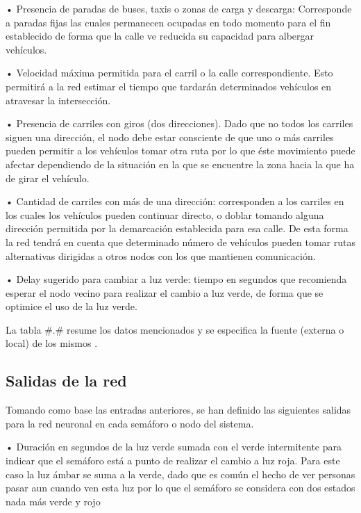 •	Presencia de paradas de buses, taxis o zonas de carga y descarga: Corresponde a paradas fijas las cuales permanecen ocupadas en todo momento para el fin establecido de forma que la calle ve reducida su capacidad para albergar veh\'{i}culos.

•	Velocidad m\'{a}xima permitida para el carril o la calle correspondiente. Esto permitir\'{a} a la red estimar el tiempo que tardar\'{a}n determinados veh\'{i}culos en atravesar la intersecci\'{o}n.

•	Presencia de carriles con giros (dos direcciones). Dado que no todos los carriles siguen una direcci\'{o}n, el nodo debe estar consciente de que uno o m\'{a}s carriles pueden permitir a los veh\'{i}culos tomar otra ruta por lo que \'{e}ste movimiento puede afectar dependiendo de la situaci\'{o}n en la que se encuentre la zona hacia la que ha de girar el veh\'{i}culo.

•	Cantidad de carriles con m\'{a}s de una direcci\'{o}n: corresponden a los carriles en los cuales los veh\'{i}culos pueden continuar directo, o doblar tomando alguna direcci\'{o}n permitida por la demarcaci\'{o}n establecida para esa calle. De esta forma la red tendr\'{a} en cuenta que determinado n\'{u}mero de veh\'{i}culos pueden tomar rutas alternativas dirigidas a otros nodos con los que mantienen comunicaci\'{o}n.

•	Delay sugerido para cambiar a luz verde: tiempo en segundos que recomienda esperar el nodo vecino para realizar el cambio a luz verde, de forma que se optimice el uso de la luz verde.

La tabla #.# resume los datos mencionados y se especifica la fuente (externa o local) de los mismos .


\subsection{Salidas de la red}

Tomando como base las entradas anteriores, se han definido las siguientes salidas para la red neuronal en cada sem\'{a}foro o nodo del sistema.

•	Duraci\'{o}n en segundos de la luz verde sumada con el verde intermitente para indicar que el sem\'{a}foro est\'{a} a punto de realizar el cambio a luz roja. Para este caso la luz \'{a}mbar se suma a la verde, dado que es com\'{u}n el hecho de ver personas pasar aun cuando ven esta luz por lo que el sem\'{a}foro se considera con dos estados nada m\'{a}s verde y rojo

